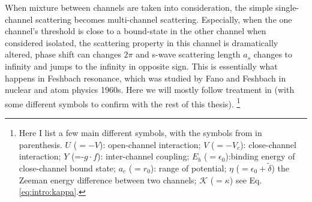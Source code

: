 When mixture between channels are taken into consideration, the simple single-channel scattering becomes multi-channel scattering.  Especially, when the one channel's threshold is close to a bound-state in the other channel when considered isolated, the scattering property in this channel is dramatically altered,  phase shift can changes $2\pi$ and s-wave scattering length $a_{s}$ changes to infinity and jumps to the infinity in opposite sign.  This is essentially what happens in Feshbach resonance, which was studied by Fano\cite{Fano} and Feshbach \cite{nuclear}  in nuclear and atom physics 1960s.  Here we will mostly follow treatment in \cite{Leggett} (with some different symbols to confirm with the rest of this thesis). 
\footnote{Here I list a few main different symbols, with the symbols from \cite{Leggett} in parenthesis.  $U$ ($=-V$): open-channel interaction; $V$ ($=-V_{c}$): close-channel interaction; $Y$ (=-$g\cdot{}f$): inter-channel coupling; $E_{b}$ ($=\epsilon_{0}$):binding energy of close-channel bound state; $a_{c}$ ($=r_{0}$): range of potential; $\eta$ ($=\epsilon_0+\tilde\delta$) the Zeeman energy difference between two channels; $\mathcal{K}$ ($=\kappa$) see Eq.\ref{eq:intro:kappa}.}

